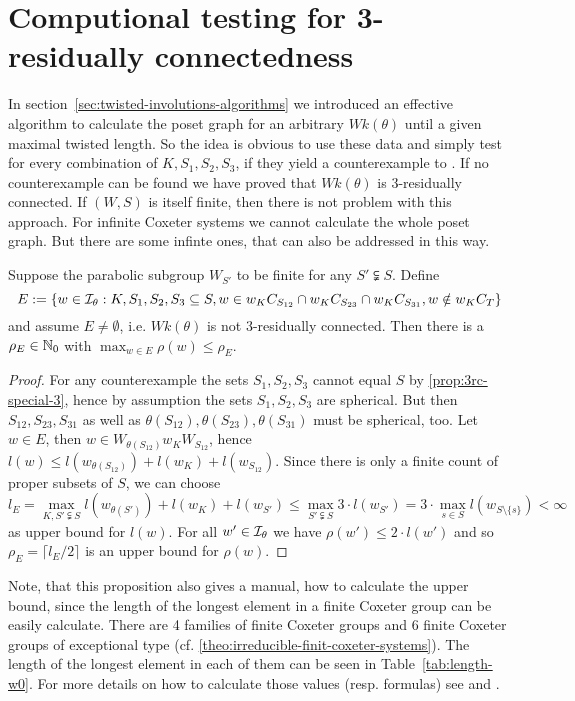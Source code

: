 \section{Computional testing for 3-residually connectedness}
\label{sec:3rc-compution-testing}

In section~\ref{sec:twisted-involutions-algorithms} we introduced an effective algorithm to calculate the poset graph for an arbitrary $Wk(\theta)$ until a given maximal twisted length. So the idea is obvious to use these data and simply test for every combination of $K,S_1,S_2,S_3$, if they yield a counterexample to . If no counterexample can be found we have proved that $Wk(\theta)$ is 3-residually connected. If $(W,S)$ is itself finite, then there is not problem with this approach. For infinite Coxeter systems we cannot calculate the whole poset graph. But there are some infinte ones, that can also be addressed in this way.

\begin{prop}
	Suppose the parabolic subgroup $W_{S'}$ to be finite for any $S' \subsetneqq S$. Define
	$$ E := \{ w \in \mathcal{I}_{\theta} : K,S_1,S_2,S_3 \subseteq S, w \in w_K C_{S_{12}} \cap w_K C_{S_{23}} \cap w_K C_{S_{31}}, w \notin w_K C_T \} $$
	and assume $E \neq \emptyset$, i.e. $Wk(\theta)$ is not 3-residually connected. Then there is a $\rho_E \in \mathbb{N}_0$ with $\max_{w \in E} \rho(w) \leq \rho_E$.

	\begin{proof}
		For any counterexample the sets $S_1,S_2,S_3$ cannot equal $S$ by \ref{prop:3rc-special-3}, hence by assumption the sets $S_1,S_2,S_3$ are spherical. But then $S_{12},S_{23},S_{31}$ as well as $\theta(S_{12}),\theta(S_{23}),\theta(S_{31})$ must be spherical, too. Let $w \in E$, then $w \in W_{\theta(S_{12})} w_K W_{S_{12}}$, hence $l(w) \leq l(w_{\theta(S_{12})}) + l(w_K) + l(w_{S_{12}})$. Since there is only a finite count of proper subsets of $S$, we can choose
		$$ l_E = \max_{K,S' \subsetneqq S} l(w_{\theta(S')}) + l(w_K) + l(w_{S'}) \leq \max_{S' \subsetneqq S} 3 \cdot l(w_{S'}) = 3 \cdot \max_{s \in S} l(w_{S \setminus \{s\}}) < \infty $$
		as upper bound for $l(w)$. For all $w' \in \mathcal{I}_{\theta}$ we have $\rho(w') \leq 2 \cdot l(w')$ and so $\rho_E = \lceil l_E/2 \rceil$ is an upper bound for $\rho(w)$.
	\end{proof}
\end{prop}

\begin{rema}
	Note, that this proposition also gives a manual, how to calculate the upper bound, since the length of the longest element in a finite Coxeter group can be easily calculate. There are 4 families of finite Coxeter groups and 6 finite Coxeter groups of exceptional type (cf. \ref{theo:irreducible-finit-coxeter-systems}). The length of the longest element in each of them can be seen in Table~\ref{tab:length-w0}. For more details on how to calculate those values (resp. formulas) see \cite[Section 1.2]{franzsen:automorphisms} and \cite[Section 2.11]{humphreys:coxeter}.
\end{rema}

